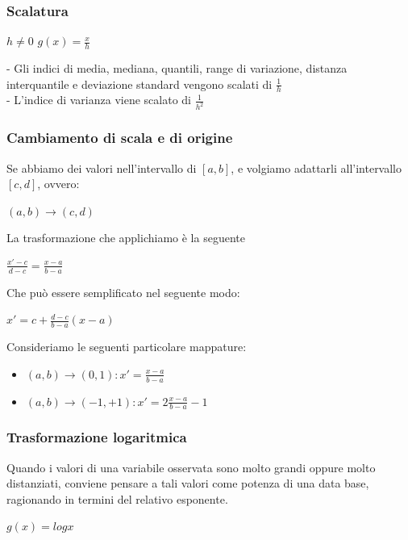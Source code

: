 \subsubsection*{Scalatura}
\begin{center}
$h \neq 0$ $g(x) = \frac{x}{h}$
\end{center}
- Gli indici di media, mediana, quantili, range di variazione, distanza interquantile e deviazione standard vengono scalati di $\frac{1}{h}$\\
- L'indice di varianza viene scalato di $\frac{1}{h^2}$

\subsubsection{Cambiamento di scala e di origine}
Se abbiamo dei valori nell'intervallo di $[a, b]$, e volgiamo adattarli all'intervallo $[c, d]$, ovvero: 
\begin{center}
$(a, b) \rightarrow (c, d)$
\end{center}
La trasformazione che applichiamo è la seguente \begin{center}
$\frac{x'-c}{d-c} = \frac{x-a}{b-a}$
\end{center}
Che può essere semplificato nel seguente modo:
\begin{center}
$x' = c + \frac{d-c}{b-a} (x-a)$
\end{center}
Consideriamo le seguenti particolare mappature:
\begin{itemize}
\item $(a, b) \rightarrow (0,1): x' = \frac{x-a}{b-a}$
\item $(a, b) \rightarrow (-1, +1): x' = 2 \frac{x-a}{b-a} -1$
\end{itemize}

\subsubsection{Trasformazione logaritmica}
Quando i valori di una variabile osservata sono molto grandi oppure molto distanziati, conviene pensare a tali valori come potenza di una data base, ragionando in termini del relativo esponente.
\begin{center}
$g(x) = log x$
\end{center}

